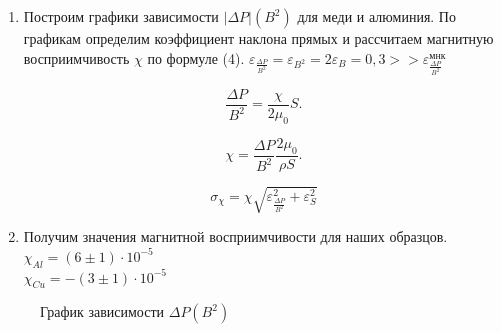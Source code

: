 \documentclass[a4paper, 12pt]{article}%
\begin{document}
\begin{enumerate}
	
	\item Построим графики зависимости $|\Delta P| (B^2)$ для меди и алюминия. По графикам определим коэффициент наклона прямых и рассчитаем магнитную восприимчивость $\chi$ по формуле (4). $\varepsilon_{	\frac{\Delta P}{B^2}} = \varepsilon_{B^2} = 2\varepsilon_{B} = 0,3 >> \varepsilon_{\frac{\Delta P}{B^2}}^{\text{мнк}}$
	
	\begin{equation}
		\frac{\Delta P}{B^2} = \frac{\chi}{2\mu_0}S.
	\end{equation}

	\begin{equation}
		\chi = \frac{\Delta P}{B^2}\frac{2\mu_0}{\rho S}.
	\end{equation}

	\begin{equation}
		\sigma_{\chi} = \chi\sqrt{\varepsilon_{\frac{\Delta P}{B^2}}^2 + \varepsilon_S^2}
	\end{equation}
	
	\item Получим значения магнитной восприимчивости для наших образцов.\\	$\chi_{Al} = (6 \pm 1) \cdot 10^{-5}$ \\
	$\chi_{Cu} = -(3 \pm 1) \cdot 10^{-5}$ 
	 
	\end{enumerate}
	 
	\begin{figure}[h]
		\caption{График зависимости $\Delta P (B^2)$}
	\end{figure}
	
\end{document}
